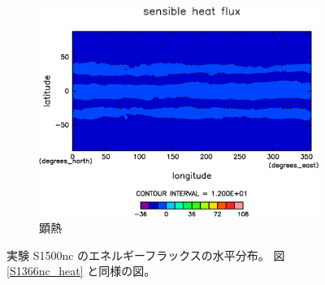 \documentclass[body]{subfiles}
\begin{document}
\begin{figure}[t]
\begin{subfigure}{.4\textwidth}
		\includegraphics[width=\textwidth]{S1500-nc/Sens,time=3650:4015-crop-rotate.pdf}
		\caption{顕熱\hmu*{[W/m^{-2}]}}\label{S1500nc顕熱}
	\end{subfigure}
	\caption[実験 S1500nc のエネルギーフラックスの水平分布]{
		実験 S1500nc のエネルギーフラックスの水平分布。
		図 \ref{S1366nc_heat} と同様の図。
	}\label{S1500nc_heat}
\end{figure}
\end{document}
